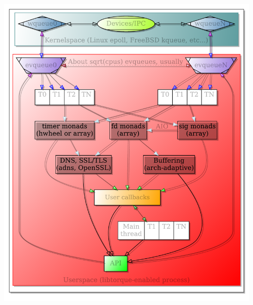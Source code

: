 \documentclass[letterpaper,10pt]{article}
\makeatletter
\newenvironment{figurehere}
{\def\@captype{figure}}
{}
\makeatother
\begin{document}
\begin{multicols}{2}
\setlength{\abovecaptionskip}{0pt}
\setlength{\belowcaptionskip}{0pt}
\begin{figurehere}
\centering
\includegraphics[width=\columnwidth]{doc/paper/libtorque}

\end{figurehere}
\end{multicols}
\end{document}
